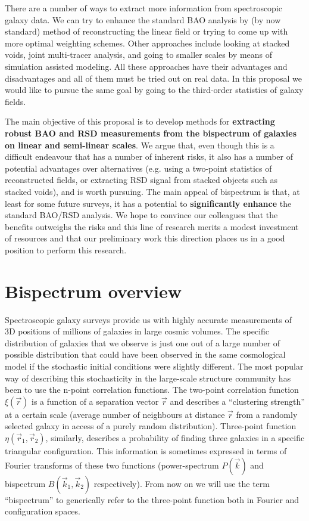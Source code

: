 There are a number of ways to extract more information from spectroscopic
galaxy data. We can try to enhance the standard BAO analysis by (by now
standard) method of reconstructing the linear field or trying to come up with
more optimal weighting schemes. Other approaches include looking at stacked
voids, joint multi-tracer analysis, and going to smaller scales by means of
simulation assisted modeling. All these approaches have their advantages and
disadvantages and all of them must be tried out on real data. In this proposal
we would like to pursue the same goal by going to the third-order statistics of
galaxy fields.

The main objective of this proposal is to develop methods for
\textbf{extracting robust BAO and RSD measurements from the  bispectrum of
galaxies on linear and semi-linear scales}. We argue that, even though this is
a difficult  endeavour that has a number of inherent risks, it also has a
number of potential advantages over alternatives (e.g.  using a two-point
statistics of reconstructed fields, or extracting RSD signal from stacked
objects such as stacked voids), and is worth pursuing. The main appeal of
bispectrum is that, at least for some future surveys, it has a potential to
\textbf{significantly enhance} the standard BAO/RSD analysis. We hope to
convince our colleagues that the benefits outweighs the risks and this line of
research merits a modest investment of resources and that our preliminary work
this direction places us in a good position  to perform this research. 


\section{Bispectrum overview}

Spectroscopic galaxy surveys provide us with highly accurate measurements of 3D
positions of millions of galaxies in large cosmic volumes.  The specific
distribution of galaxies that we observe is just one out of a large number of
possible distribution that could have been observed in the same cosmological
model if the stochastic initial conditions were slightly different. The most
popular way of describing this stochasticity in the large-scale structure
community has been to use the n-point correlation functions.  The two-point
correlation function $\xi(\vec{r})$ is a function of a separation vector
$\vec{r}$ and describes a ``clustering strength'' at a certain scale (average
number of neighbours at distance $\vec{r}$ from a randomly selected galaxy in
access of a purely random distribution).  Three-point function $\eta(\vec{r}_1,
\vec{r}_2)$, similarly, describes a probability of finding three galaxies  in a
specific triangular configuration.  This information is sometimes expressed in
terms of Fourier transforms of these two functions  (power-spectrum
$P(\vec{k})$ and bispectrum $B(\vec{k}_1, \vec{k}_2)$ respectively). From now
on we will use the term ``bispectrum'' to generically refer to the three-point
function both in Fourier and configuration spaces. 


